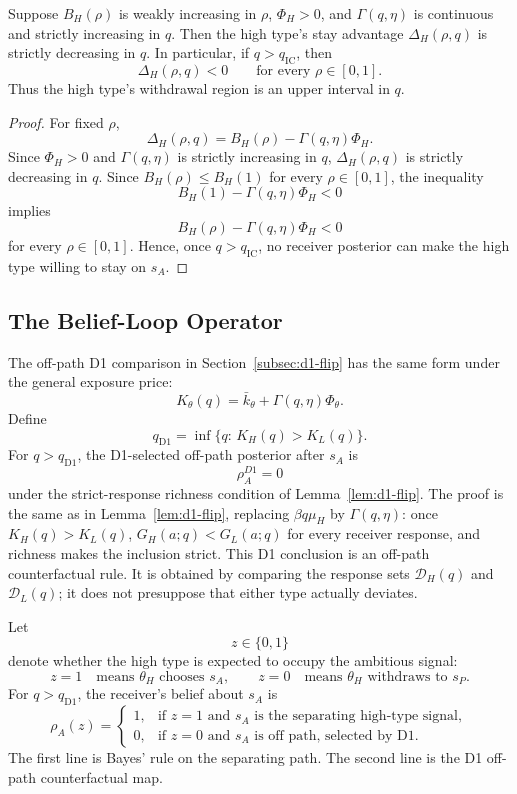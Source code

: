 \begin{lemma}
\label{lem:monotone-stopping}
Suppose \(B_H(\rho)\) is weakly increasing in \(\rho\), \(\Phi_H>0\), and \(\Gamma(q,\eta)\) is continuous and strictly increasing in \(q\). Then the high type's stay advantage \(\Delta_H(\rho,q)\) is strictly decreasing in \(q\). In particular, if \(q>q_{\mathrm{IC}}\), then
\[
\Delta_H(\rho,q)<0
\qquad\text{for every }\rho\in[0,1].
\]
Thus the high type's withdrawal region is an upper interval in \(q\).
\end{lemma}

\begin{proof}
For fixed \(\rho\),
\[
\Delta_H(\rho,q)=B_H(\rho)-\Gamma(q,\eta)\Phi_H.
\]
Since \(\Phi_H>0\) and \(\Gamma(q,\eta)\) is strictly increasing in \(q\), \(\Delta_H(\rho,q)\) is strictly decreasing in \(q\). Since \(B_H(\rho)\le B_H(1)\) for every \(\rho\in[0,1]\), the inequality
\[
B_H(1)-\Gamma(q,\eta)\Phi_H<0
\]
implies
\[
B_H(\rho)-\Gamma(q,\eta)\Phi_H<0
\]
for every \(\rho\in[0,1]\). Hence, once \(q>q_{\mathrm{IC}}\), no receiver posterior can make the high type willing to stay on \(s_A\).
\end{proof}

\subsection{The Belief-Loop Operator}
\label{subsec:belief-loop-operator}

The off-path D1 comparison in Section~\ref{subsec:d1-flip} has the same form under the general exposure price:
\[
K_\theta(q)=\bar k_\theta+\Gamma(q,\eta)\Phi_\theta.
\]
Define
\[
q_{\mathrm{D1}}
=
\inf\{q:\,K_H(q)>K_L(q)\}.
\]
For \(q>q_{\mathrm{D1}}\), the D1-selected off-path posterior after \(s_A\) is
\[
\rho_A^{D1}=0
\]
under the strict-response richness condition of Lemma~\ref{lem:d1-flip}. The proof is the same as in Lemma~\ref{lem:d1-flip}, replacing \(\beta q\mu_H\) by \(\Gamma(q,\eta)\): once \(K_H(q)>K_L(q)\), \(G_H(a;q)<G_L(a;q)\) for every receiver response, and richness makes the inclusion strict. This D1 conclusion is an off-path counterfactual rule. It is obtained by comparing the response sets \(\mathcal D_H(q)\) and \(\mathcal D_L(q)\); it does not presuppose that either type actually deviates.

Let
\[
z\in\{0,1\}
\]
denote whether the high type is expected to occupy the ambitious signal:
\[
z=1 \quad\text{means } \theta_H \text{ chooses }s_A,
\qquad
z=0 \quad\text{means } \theta_H \text{ withdraws to }s_P.
\]
For \(q>q_{\mathrm{D1}}\), the receiver's belief about \(s_A\) is
\[
\rho_A(z)=
\begin{cases}
1, & \text{if }z=1\text{ and }s_A\text{ is the separating high-type signal},\\
0, & \text{if }z=0\text{ and }s_A\text{ is off path, selected by D1}.
\end{cases}
\]
The first line is Bayes' rule on the separating path. The second line is the D1 off-path counterfactual map.

